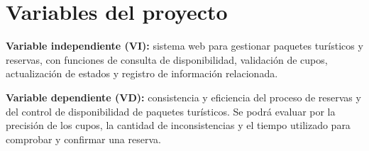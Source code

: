 \chapter{Variables del proyecto}
\label{cap:variables}

\textbf{Variable independiente (VI):} sistema web para gestionar paquetes
turísticos y reservas, con funciones de consulta de disponibilidad,
validación de cupos, actualización de estados y registro de información
relacionada.

\textbf{Variable dependiente (VD):} consistencia y eficiencia del proceso de
reservas y del control de disponibilidad de paquetes turísticos. Se podrá
evaluar por la precisión de los cupos, la cantidad de inconsistencias y el
tiempo utilizado para comprobar y confirmar una reserva.
